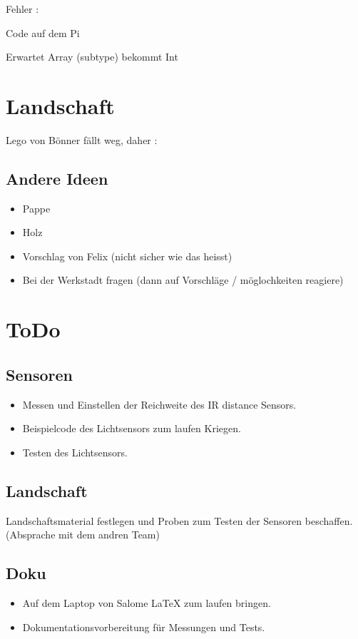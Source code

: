\documentclass{article}
\begin{document}
Fehler :
	
	Code auf dem Pi
	
	Erwartet Array (subtype) bekommt Int  

\section{Landschaft}

Lego von B\"{o}nner f\"{a}llt weg, daher : 

\subsection{Andere Ideen}

\begin{itemize}

\item Pappe

\item Holz

\item Vorschlag von Felix (nicht sicher wie das heisst)

\item Bei der Werkstadt fragen (dann auf Vorschl\"{a}ge / m\"{o}glochkeiten reagiere)

\end{itemize}

\section{ToDo}

\subsection{Sensoren}

\begin{itemize}

\item Messen und Einstellen der Reichweite des IR distance Sensors.

\item Beispielcode des Lichtsensors zum laufen Kriegen.

\item Testen des Lichtsensors.

\end{itemize}

\subsection{Landschaft}

Landschaftsmaterial festlegen und Proben zum Testen der Sensoren beschaffen. (Absprache mit dem andren Team)

\subsection{Doku}

\begin{itemize}

\item Auf dem Laptop von Salome \LaTeX{} zum laufen bringen.

\item Dokumentationsvorbereitung f\"{u}r Messungen und Tests.

\end{itemize}
\end{document}
